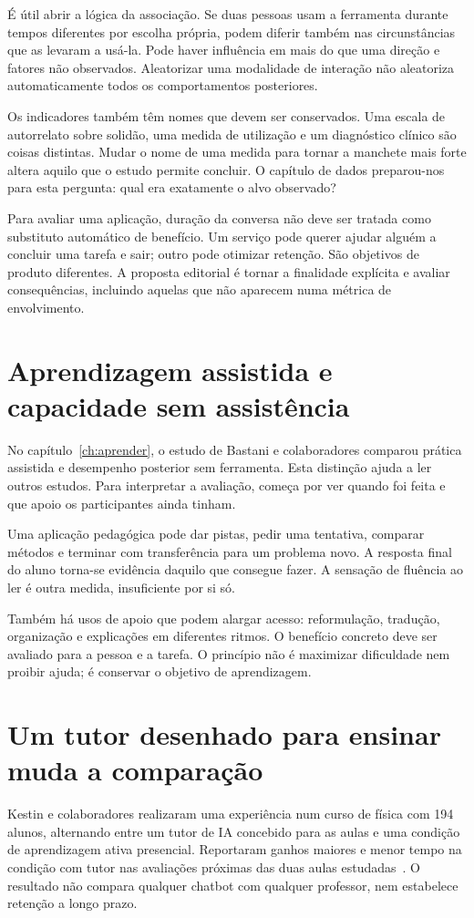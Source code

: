 É útil abrir a lógica da associação. Se duas pessoas usam a ferramenta durante tempos diferentes por escolha própria, podem diferir também nas circunstâncias que as levaram a usá-la. Pode haver influência em mais do que uma direção e fatores não observados. Aleatorizar uma modalidade de interação não aleatoriza automaticamente todos os comportamentos posteriores.

Os indicadores também têm nomes que devem ser conservados. Uma escala de autorrelato sobre solidão, uma medida de utilização e um diagnóstico clínico são coisas distintas. Mudar o nome de uma medida para tornar a manchete mais forte altera aquilo que o estudo permite concluir. O capítulo de dados preparou-nos para esta pergunta: qual era exatamente o alvo observado?

Para avaliar uma aplicação, duração da conversa não deve ser tratada como substituto automático de benefício. Um serviço pode querer ajudar alguém a concluir uma tarefa e sair; outro pode otimizar retenção. São objetivos de produto diferentes. A proposta editorial é tornar a finalidade explícita e avaliar consequências, incluindo aquelas que não aparecem numa métrica de envolvimento.

\section{Aprendizagem assistida e capacidade sem assistência}
No capítulo~\ref{ch:aprender}, o estudo de Bastani e colaboradores comparou prática assistida e desempenho posterior sem ferramenta. Esta distinção ajuda a ler outros estudos. Para interpretar a avaliação, começa por ver quando foi feita e que apoio os participantes ainda tinham.

Uma aplicação pedagógica pode dar pistas, pedir uma tentativa, comparar métodos e terminar com transferência para um problema novo. A resposta final do aluno torna-se evidência daquilo que consegue fazer. A sensação de fluência ao ler é outra medida, insuficiente por si só.

Também há usos de apoio que podem alargar acesso: reformulação, tradução, organização e explicações em diferentes ritmos. O benefício concreto deve ser avaliado para a pessoa e a tarefa. O princípio não é maximizar dificuldade nem proibir ajuda; é conservar o objetivo de aprendizagem.

\section{Um tutor desenhado para ensinar muda a comparação}
Kestin e colaboradores realizaram uma experiência num curso de física com 194 alunos, alternando entre um tutor de IA concebido para as aulas e uma condição de aprendizagem ativa presencial. Reportaram ganhos maiores e menor tempo na condição com tutor nas avaliações próximas das duas aulas estudadas~\citep{kestin2025}. O resultado não compara qualquer chatbot com qualquer professor, nem estabelece retenção a longo prazo.

